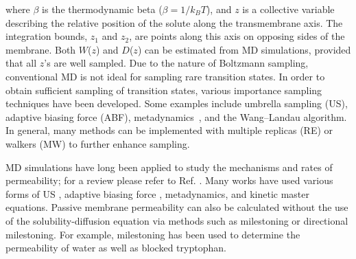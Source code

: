 where $\beta$ is the thermodynamic beta ($\beta=1/k_{B}T$), and $z$ is a collective variable describing the relative position of the solute along the transmembrane axis. The integration bounds, $z_1$ and $z_2$, are points along this axis on opposing sides of the membrane. 
Both $W$($z$) and $D$($z$) can be estimated from MD simulations, provided that all $z$'s are well sampled.
Due to the nature of Boltzmann sampling, conventional MD is not ideal for sampling rare transition states. In order to obtain sufficient sampling of transition states, various importance sampling techniques have been developed. Some examples include umbrella sampling (US)\cite{Torrie1977}, adaptive biasing force (ABF)\cite{Rodriguez-Gomez2004,Darve2001,Darve2008a,Wei2011}, metadynamics~\cite{Laio2002}, and the Wang--Landau algorithm\cite{Wang2001}. In general, many methods can be implemented with multiple replicas (RE) or walkers (MW) to further enhance sampling\cite{Swendsen1986a}.  
\par MD simulations have long been applied to study the mechanisms and rates of permeability; for a review please refer to Ref. . Many works have used various forms of US \cite{Wilson1996,Grossfield2002,Ulander2003a,Bemporad2004,MacCallum2007,Johansson2008,MacCallum2008,Bauer2011,Tejwani2011,MacCallum2011,Paloncyova2012,Swift2013,Riahi2014,Carpenter2014,Issack2015}, adaptive biasing force \cite{Bemporad2005,Comer2014a}, metadynamics\cite{Ghaemi2012}, and kinetic master equations\cite{Parisio2013}. Passive membrane permeability can also be calculated without the use of the solubility-diffusion equation via methods such as milestoning or directional milestoning\cite{Kirmizialtin2011,Vanden-Eijnden2008,Majek2010,Bello-Rivas2015}. For example, milestoning has been used to determine the permeability of water as well as blocked tryptophan\cite{Cardenas2012,Cardenas2014}.  

